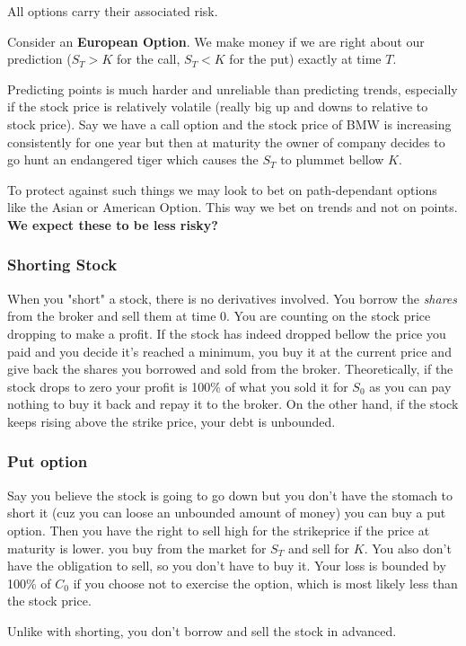 \documentclass{article}
\begin{document}
All options carry their associated risk. 

Consider an \textbf{European Option}. We make money if we are right about our prediction ($S_T > K$ for the call, $S_T < K$ for the put) exactly at time $T$.

Predicting points is much harder and unreliable than predicting trends, especially if the stock price is relatively volatile (really big up and downs to relative to stock price). Say we have a call option and the stock price of BMW is increasing consistently for one year but then at maturity the owner of company decides to go hunt an endangered tiger which causes the $S_T$ to plummet bellow $K$.

To protect against such things we may look to bet on path-dependant options like the Asian or American Option. This way we bet on trends and not on points.  \textbf{We expect these to be less risky?}

\subsubsection{Shorting Stock}
When you "short" a stock, there is no derivatives involved. You borrow the \textit{shares} from the broker and sell them at time 0. You are counting on the stock price dropping to make a profit. If the stock has indeed dropped bellow the price you paid and you decide it's reached a minimum, you buy it at the current price and give back the shares you borrowed and sold from the broker. Theoretically, if the stock drops to zero your profit is 100\% of what you sold it for $S_0$ as you can pay nothing to buy it back and repay it to the broker. On the other hand, if the stock keeps rising above the strike price, your debt is unbounded.

\subsubsection{Put option}
Say you believe the stock is going to go down but you don't have the stomach to short it (cuz you can loose an unbounded amount of money) you can buy a put option. Then you have the right to sell high for the strikeprice if the price at maturity is lower. you buy from the market for $S_T$ and sell for $K$. You also don't have the obligation to sell, so you don't have to buy it. Your loss is bounded by 100\%  of $C_0$ if you choose not to exercise the option, which is most likely less than the stock price. 

Unlike with shorting, you don't borrow and sell the stock in advanced. 
\end{document}

